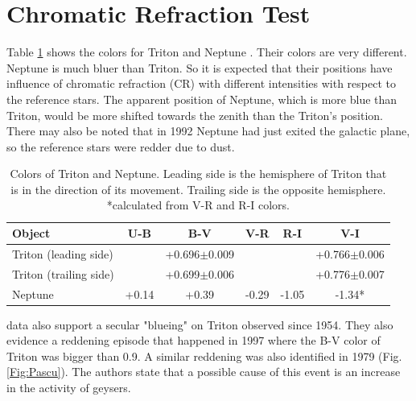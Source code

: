 \documentclass[12pt,a4paper]{report}
\begin{document}
\section*{Chromatic Refraction Test}

Table \ref{Tab:colors} shows the colors for Triton \citep{Pascu2006} and Neptune \cite{Schmude2016}. Their colors are very different. Neptune is much bluer than Triton. So it is expected that their positions have influence of chromatic refraction (CR) with different intensities with respect to the reference stars. The apparent position of Neptune, which is more blue than Triton, would be more shifted towards the zenith than the Triton's position. There may also be noted that in 1992 Neptune had just exited the galactic plane, so the reference stars were redder due to dust.

\begin{table}[h]
\centering
\begin{tabular}{|l|c|c|c|c|c|}
\hline
Object & U-B & B-V & V-R & R-I & V-I\\
\hline
Triton (leading side) & & +0.696$\pm$0.009 & & & +0.766$\pm$0.006 \\
Triton (trailing side) & & +0.699$\pm$0.006 & & & +0.776$\pm$0.007 \\
Neptune & +0.14 & +0.39 & -0.29 & -1.05 & -1.34*\\
\hline
\end{tabular}
\caption{Colors of Triton and Neptune. Leading side is the hemisphere of Triton that is in the direction of its movement. Trailing side is the opposite hemisphere. \\ *calculated from V-R and R-I colors.}
\label{Tab:colors}
\end{table}

\citep{Pascu2006} data also support a secular "blueing" on Triton observed since 1954. They also evidence a reddening episode that happened in 1997 where the B-V color of Triton was bigger than 0.9. A similar reddening was also identified in 1979 (Fig. \ref{Fig:Pascu}). The authors state that a possible cause of this event is an increase in the activity of geysers.
\end{document}
